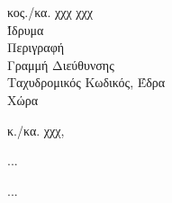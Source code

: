 \documentclass[%
  english,
  custom_invoice_asymTypB_el,
  DIV=8,
  fontsize=11pt]{scrlttr2}
\begin{document}
  \begin{letter}{κος./κα. χχχ χχχ\\
  Ίδρυμα\\
  Περιγραφή\\
  Γραμμή Διεύθυνσης\\
  Ταχυδρομικός Κωδικός, Έδρα\\
  Χώρα}

  \opening{κ./κα. χχχ,}

  \begin{flushleft}
  ...
  
  ...

  \end{flushleft}


  \end{letter}
\end{document}
